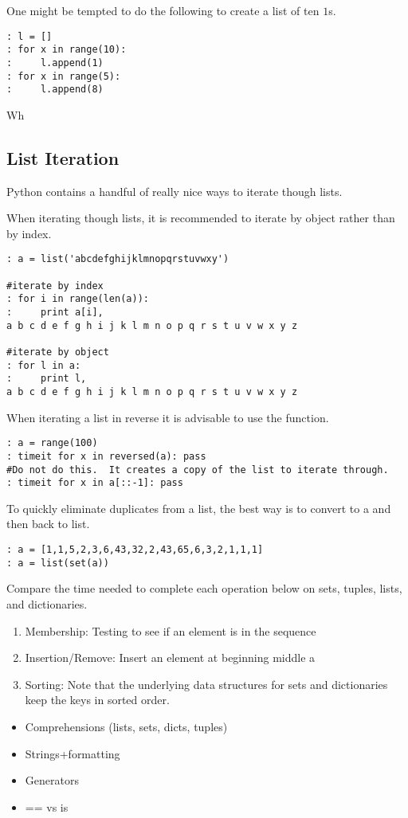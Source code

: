 One might be tempted to do the following to create a list of ten $1$s.
\begin{lstlisting}
: l = []
: for x in range(10):
:     l.append(1)
: for x in range(5):
:     l.append(8)
\end{lstlisting}
Wh


\subsection*{List Iteration}
Python contains a handful of really nice ways to iterate though lists.

When iterating though lists, it is recommended to iterate by object rather than by index.
\begin{lstlisting}
: a = list('abcdefghijklmnopqrstuvwxy')

#iterate by index
: for i in range(len(a)):
:     print a[i],
a b c d e f g h i j k l m n o p q r s t u v w x y z

#iterate by object
: for l in a:
:     print l,
a b c d e f g h i j k l m n o p q r s t u v w x y z
\end{lstlisting}

When iterating a list in reverse it is advisable to use the  function.
\begin{lstlisting}
: a = range(100)
: timeit for x in reversed(a): pass
#Do not do this.  It creates a copy of the list to iterate through.
: timeit for x in a[::-1]: pass
\end{lstlisting}

To quickly eliminate duplicates from a list, the best way is to convert to a 
and then back to list.
\begin{lstlisting}
: a = [1,1,5,2,3,6,43,32,2,43,65,6,3,2,1,1,1]
: a = list(set(a))
\end{lstlisting}

\begin{problem}
Compare the time needed to complete each operation below on sets, tuples, lists, and dictionaries.
\begin{enumerate}
\item Membership: Testing to see if an element is in the sequence
\item Insertion/Remove: Insert an element at beginning middle a
\item Sorting: Note that the underlying data structures for sets and dictionaries keep the keys in sorted order.
\end{enumerate}

\end{problem}



\begin{itemize}
\item Comprehensions (lists, sets, dicts, tuples)
\item Strings+formatting
\item Generators
\item == vs is
\end{itemize}